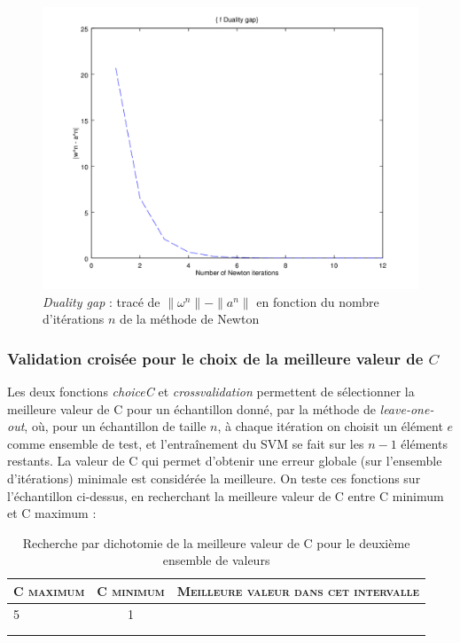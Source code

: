 \documentclass{article}
\begin{document}
         \begin{figure}
           \begin{center}
             \includegraphics[scale=0.5]{images/duality2.png}
             \caption{\emph{Duality gap} : tracé de $\|\omega^n\| - \|a^n\|$ en fonction du nombre d'itérations $n$ de la méthode de Newton}
           \end{center}
         \end{figure}

\subsubsection{Validation croisée pour le choix de la meilleure valeur de $C$}

Les deux fonctions \emph{choiceC} et \emph{crossvalidation} permettent de sélectionner la meilleure valeur de C pour un échantillon donné, par la méthode de \emph{leave-one-out}, où, pour un échantillon de taille $n$, à chaque itération on choisit un élément $e$ comme ensemble de test, et l'entraînement du SVM se fait sur les $n-1$ éléments restants. La valeur de C qui permet d'obtenir une erreur globale (sur l'ensemble d'itérations) minimale est considérée la meilleure. On teste ces fonctions sur l'échantillon ci-dessus, en recherchant la meilleure valeur de C entre C minimum et C maximum :\\

     \begin{table}[H]
       \caption{Recherche par dichotomie de la meilleure valeur de C pour le deuxième ensemble de valeurs}
       \begin{tabular}{|l|c|r|}
         \hline
         \textsc{C maximum} & \textsc{C minimum} & \textsc{Meilleure valeur dans cet intervalle}\\
         \hline
         5 & 1 & \\
         \hline
          &  & \\
         \hline
          &  & \\
         \hline
       \end{tabular}
     \end{table}
\end{document}
